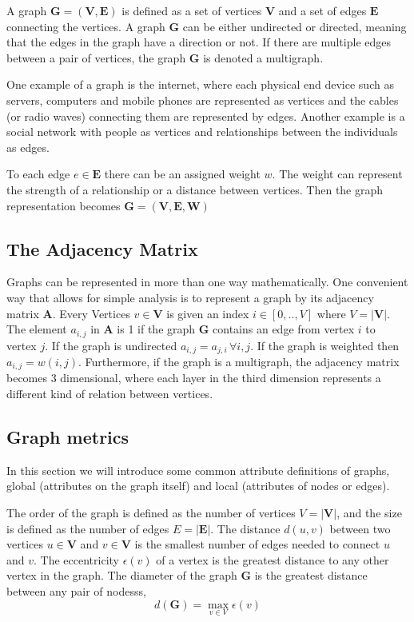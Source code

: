 \newcommand{\graph}{\textbf{G}}
\newcommand{\vertices}{\textbf{V}}
\newcommand{\edges}{\textbf{E}}
\newcommand{\weights}{\textbf{W}}
\newcommand{\adjmat}{\textbf{A}}

A graph $\graph=(\vertices,\edges)$ is defined as a set of vertices $\vertices$ and a set of edges $\edges$ connecting the vertices. A graph $\graph$ can be either undirected or directed, meaning that the edges in the graph have a direction or not. If there are multiple edges between a pair of vertices, the graph $\graph$ is denoted a multigraph.

One example of a graph is the internet, where each physical end device such as servers, computers and mobile phones are represented as vertices and the cables (or radio waves) connecting them are represented by edges. Another example is a social network with people as vertices and relationships between the individuals as edges.

To each edge $e\in\edges$ there can be an assigned weight $w$. The weight can represent the strength of a relationship or a distance between vertices. Then the graph representation becomes $\graph=(\vertices,\edges,\weights)$

\subsection{The Adjacency Matrix}
Graphs can be represented in more than one way mathematically. One convenient way that allows for simple analysis is to represent a graph by its adjacency matrix $\adjmat$. Every Vertices $v\in\vertices$ is given an index $i \in [0,..,V]$ where $V = |\vertices|$. The element $a_{i,j}$ in $\adjmat$ is 1 if the graph $\graph$ contains an edge from vertex $i$ to vertex $j$. If the graph is undirected $a_{i,j}=a_{j,i}\, \forall i,j$\cite{adj_matrix}. If the graph is weighted then $a_{i,j} = w(i,j)$. Furthermore, if the graph is a multigraph, the adjacency matrix becomes 3 dimensional, where each layer in the third dimension represents a different kind of relation between vertices.

\subsection{Graph metrics}
In this section we will introduce some common attribute definitions of graphs, global (attributes on the graph itself) and local (attributes of nodes or edges).

The order of the graph is defined as the number of vertices $V=|\vertices|$, and the size is defined as the number of edges $E=|\edges|$. The distance $d(u,v)$ between two vertices $u\in\vertices$ and $v\in\vertices$ is the smallest number of edges needed to connect $u$ and $v$. The eccentricity $\epsilon(v)$ of a vertex is the greatest distance to any other vertex in the graph. The diameter of the graph $\graph$ is the greatest distance between any pair of nodesss\cite{graph_theory}, 
$$d(\textbf{G}) = \max_{v \in V}\epsilon(v)$$

